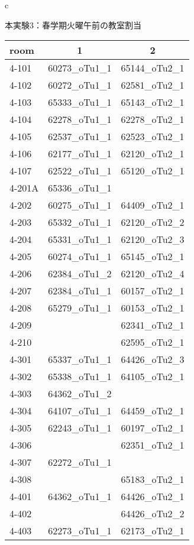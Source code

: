 \begin{table}[htbp]
\begin{center}
\begin{tabular}{c}
{{\begin{minipage}{0.5\hsize}
 \begin{center}
本実験3：春学期火曜午前の教室割当                              
  \begin{tabular}{lcc}
   \hline
   room & 1 & 2 \\
   \hline
   4-101 & 60273\_oTu1\_1 & 65144\_oTu2\_1 \\
   4-102 & 60272\_oTu1\_1 & 62581\_oTu2\_1 \\
   4-103 & 65333\_oTu1\_1 & 65143\_oTu2\_1 \\
   4-104 & 62278\_oTu1\_1 & 62278\_oTu2\_1 \\
   4-105 & 62537\_oTu1\_1 & 62523\_oTu2\_1 \\
   4-106 & 62177\_oTu1\_1 & 62120\_oTu2\_1 \\
   4-107 & 62522\_oTu1\_1 & 65120\_oTu2\_1 \\
   4-201A & 65336\_oTu1\_1 &   \\
   4-202 & 60275\_oTu1\_1 & 64409\_oTu2\_1 \\
   4-203 & 65332\_oTu1\_1 & 62120\_oTu2\_2 \\
   4-204 & 65331\_oTu1\_1 & 62120\_oTu2\_3 \\
   4-205 & 60274\_oTu1\_1 & 65145\_oTu2\_1 \\
   4-206 & 62384\_oTu1\_2 & 62120\_oTu2\_4 \\
   4-207 & 62384\_oTu1\_1 & 60157\_oTu2\_1 \\
   4-208 & 65279\_oTu1\_1 & 60153\_oTu2\_1 \\
   4-209 &   & 62341\_oTu2\_1 \\
   4-210 &   & 62595\_oTu2\_1 \\
   4-301 & 65337\_oTu1\_1 & 64426\_oTu2\_3 \\
   4-302 & 65338\_oTu1\_1 & 64105\_oTu2\_1 \\
   4-303 & 64362\_oTu1\_2 &   \\
   4-304 & 64107\_oTu1\_1 & 64459\_oTu2\_1 \\
   4-305 & 62243\_oTu1\_1 & 60197\_oTu2\_1 \\
   4-306 &   & 62351\_oTu2\_1 \\
   4-307 & 62272\_oTu1\_1 &   \\
   4-308 &   & 65183\_oTu2\_1 \\
   4-401 & 64362\_oTu1\_1 & 64426\_oTu2\_1 \\
   4-402 &   & 64426\_oTu2\_2 \\
   4-403 & 62273\_oTu1\_1 & 62173\_oTu2\_1 \\

\end{tabular}
\end{center}
\end{minipage}}}
\end{tabular}
\end{center}
\end{table}
